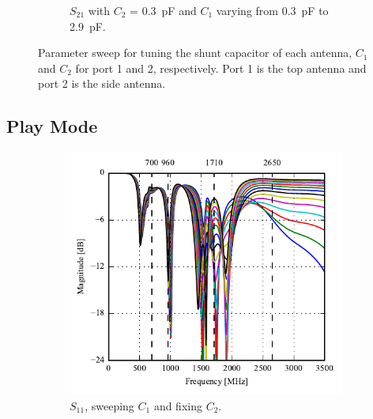 \begin{figure}[htbp]
\begin{subfigure}[b]{0.49\linewidth}
        \caption{$S_{21}$ with $C_2$ = \SI{0.3}{pF} and $C_1$ varying from \SI{0.3}{pF} to \SI{2.9}{pF}.}
        \label{fig:ant1_s22}
    \end{subfigure}
    \caption{Parameter sweep for tuning the shunt capacitor of each antenna, $C_1$ and $C_2$ for port 1 and 2, respectively. Port 1 is the top antenna and port 2 is the side antenna.}
    \label{fig:sparam_mono}
\end{figure}


\subsection{Play Mode}
\begin{figure}[htbp]
   \begin{subfigure}[b]{0.49\linewidth}
        \centering
        \includegraphics{img/tech_sol/monopole/play_mode/s11}
        \caption{$S_{11}$, sweeping $C_1$ and fixing $C_2$.}
        \label{fig:ant1_s11}
    \end{subfigure}
    \hfill
    \begin{subfigure}[b]{0.49\linewidth}
        \centering

\end{subfigure}
\end{figure}
